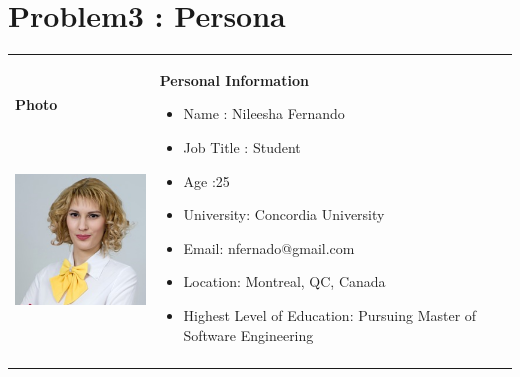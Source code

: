 \documentclass[12pt]{article}
\begin{document}
\section{Problem3 : Persona}
\begin{table}[H]
 			\centering
\begin{tabular}{p{1.86in}p{4.23in}}
\hline
\multicolumn{1}{|p{1.86in}}{{\fontsize{10pt}{12.0pt}\selectfont \textbf{Photo}} \par {\fontsize{10pt}{12.0pt}\selectfont \textbf{\ \ \ \ \   }} \par 
	\begin{Center}
		\includegraphics[width=1.86in,height=1.6in]{./nileesha.png}
	\end{Center}
} & 
\multicolumn{1}{|p{4.23in}|}{{\fontsize{10pt}{12.0pt}\selectfont \textbf{Personal Information}} \par \begin{itemize}
	\item {\fontsize{10pt}{12.0pt}\selectfont Name : Nileesha Fernando} \par 	\item {\fontsize{10pt}{12.0pt}\selectfont Job Title : Student } \par 	\item {\fontsize{10pt}{12.0pt}\selectfont Age :25} \par 	\item {\fontsize{10pt}{12.0pt}\selectfont University: Concordia University} \par 	\item {\fontsize{10pt}{12.0pt}\selectfont Email: nfernado@gmail.com} \par 	\item {\fontsize{10pt}{12.0pt}\selectfont Location: Montreal, QC, Canada} \par 	\item {\fontsize{10pt}{12.0pt}\selectfont Highest Level of Education: Pursuing Master of Software Engineering}
\end{itemize} \par } \\
\hhline{--}

\end{tabular}
\end{table}
\end{document}
